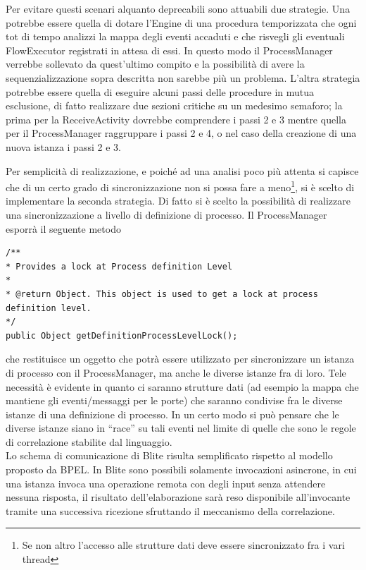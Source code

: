 Per evitare questi scenari alquanto deprecabili sono attuabili due strategie.
Una potrebbe essere quella di dotare l'Engine di una procedura temporizzata che
ogni tot di tempo analizzi la mappa degli eventi accaduti e che risvegli
gli eventuali FlowExecutor registrati in attesa di essi. In questo modo il
ProcessManager verrebbe sollevato da quest'ultimo compito e la possibilità di
avere la sequenzializzazione sopra descritta non sarebbe più un problema.
L'altra strategia potrebbe essere quella di eseguire alcuni passi delle
procedure in mutua esclusione, di fatto realizzare due sezioni critiche su un
medesimo semaforo; la prima per la ReceiveActivity dovrebbe comprendere i passi
2 e 3 mentre quella per il ProcessManager raggruppare i passi 2 e 4, o nel caso
della creazione di una nuova istanza i passi 2 e 3.

Per semplicità di realizzazione, e poiché ad una analisi poco più attenta si
capisce che di un certo grado di sincronizzazione non si possa fare a meno\footnote{Se
non altro l'accesso alle strutture dati deve essere sincronizzato fra i vari
thread}, si \`e scelto di implementare la seconda strategia. Di fatto si \`e
scelto la possibilità di realizzare una sincronizzazione a livello di
definizione di processo. Il ProcessManager esporrà il seguente metodo

\begin{lstlisting}
/**
* Provides a lock at Process definition Level
* 
* @return Object. This object is used to get a lock at process definition level.
*/
public Object getDefinitionProcessLevelLock();
\end{lstlisting}

che restituisce un oggetto che potrà essere utilizzato per sincronizzare un
istanza di processo con il ProcessManager, ma anche le diverse istanze fra di
loro. Tele necessità \`e evidente in quanto ci saranno strutture dati (ad
esempio la mappa che mantiene gli eventi/messaggi per le porte) che saranno
condivise fra le diverse istanze di una definizione di processo. In un certo
modo si può pensare che le diverse istanze siano in ``race'' su tali eventi
nel limite di quelle che sono le regole di correlazione stabilite dal
linguaggio.
\\

Lo schema di comunicazione di Blite risulta semplificato rispetto al modello
proposto da BPEL. In Blite sono possibili solamente invocazioni asincrone, in
cui una istanza invoca una operazione remota con degli input senza attendere
nessuna risposta, il risultato dell'elaborazione sarà reso disponibile
all'invocante tramite una successiva ricezione sfruttando il meccanismo della
correlazione. 

